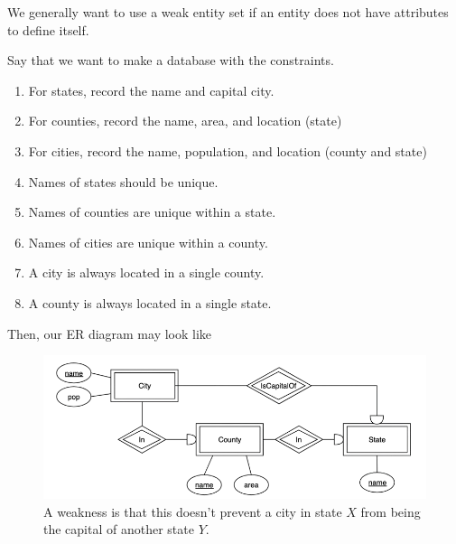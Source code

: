   We generally want to use a weak entity set if an entity does not have attributes to define itself. 
  
  \begin{example}
    Say that we want to make a database with the constraints. 
    \begin{enumerate}
      \item For states, record the name and capital city. 
      \item For counties, record the name, area, and location (state) 
      \item For cities, record the name, population, and location (county and state) 
      \item Names of states should be unique. 
      \item Names of counties are unique within a state. 
      \item Names of cities are unique within a county. 
      \item A city is always located in a single county. 
      \item A county is always located in a single state. 
    \end{enumerate}
    Then, our ER diagram may look like 
    \begin{figure}[H]
      \centering 
      \includegraphics[scale=0.3]{img/city1.png}
      \caption{A weakness is that this doesn't prevent a city in state $X$ from being the capital of another state $Y$.} 
      \label{fig:city1}
    \end{figure}
  \end{example}

